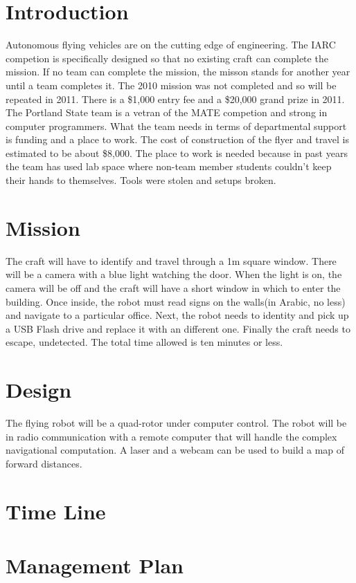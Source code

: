 \documentclass{article}
\begin{document}
\section{Introduction}

Autonomous flying vehicles are on the cutting edge of engineering. The IARC competion is specifically designed so that no existing craft can complete the mission. If no team can complete the mission, the misson stands for another year until a team completes it. The 2010 mission was not completed and so will be repeated in 2011. There is a \$1,000 entry fee and a \$20,000 grand prize in 2011. The Portland State team is a vetran of the MATE competion and strong in computer programmers. What the team needs in terms of departmental support is funding and a place to work. The cost of construction of the flyer and travel is estimated to be about \$8,000. The place to work is needed because in past years the team has used lab space where non-team member students couldn't keep their hands to themselves. Tools were stolen and setups broken. 

\section{Mission}

The craft will have to identify and travel through a 1m square window. There will be a camera with a blue light watching the door. When the light is on, the camera will be off and the craft will have a short window in which to enter the building. Once inside, the robot must read signs on the walls(in Arabic, no less) and navigate to a particular office. Next, the robot needs to identity and pick up a USB Flash drive and replace it with an different one. Finally the craft needs to escape, undetected. The total time allowed is ten minutes or less. 
\section{Design}

The flying robot will be a quad-rotor under computer control. The robot will be in radio communication with a remote computer that will handle the complex navigational computation. A laser and a webcam can be used to build a map of forward distances. 

\section{Time Line}
\section{Management Plan}
\end{document}
